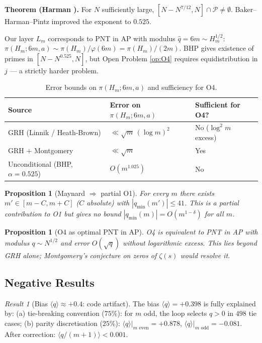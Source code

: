\documentclass[11pt,a4paper]{article}
\newtheorem{proposition}[theorem]{Proposition}
\theoremstyle{definition}
\theoremstyle{remark}
\newtheorem{result}[theorem]{Result}
\newcommand{\qmin}{q_{\min}}
\begin{document}
\smallskip
\noindent\textbf{Theorem (Harman \cite{Harman1982}).}
For $N$ sufficiently large, $[N-N^{7/12},N]\cap\mathcal{P}\ne\emptyset$.
Baker--Harman--Pintz \cite{BakerHarmanPintz2001} improved the
exponent to $0.525$.

Our layer $L_{m}$ corresponds to PNT in AP with modulus
$\hat{q}=6m\sim H_{m}^{1/2}$:
$\pi(H_{m};6m,a)\sim\pi(H_{m})/\varphi(6m)=\pi(H_{m})/(2m)$. BHP
gives existence of primes in $[N-N^{0.525},N]$, but Open Problem
\ref{op:O4} requires equidistribution in $j$ --- a strictly harder
problem.

\begin{table}[ht]\centering
\caption{Error bounds on $\pi(H_{m};6m,a)$ and sufficiency for O4.}
\begin{tabular}{@{}lll@{}}
\toprule
Source & Error on $\pi(H_{m};6m,a)$ & Sufficient for O4? \\
\midrule
GRH (Linnik / Heath-Brown) & $\ll\sqrt{m}\,(\log m)^{2}$ &
No ($\log^{2}m$ excess) \\
GRH $+$ Montgomery & $\ll\sqrt{m}$ & Yes \\
Unconditional (BHP, $\alpha=0.525$) & $O(m^{1.025})$ & No \\
\bottomrule
\end{tabular}
\end{table}

\begin{proposition}[Maynard \cite{Maynard2015} $\Rightarrow$ partial
O1]
For every $m$ there exists $m'\in[m-C,m+C]$ ($C$ absolute) with
$|\qmin(m')|\le 41$. This is a partial contribution to O1 but gives
no bound $|\qmin(m)|=O(m^{1-\delta})$ for all $m$.
\end{proposition}

\begin{proposition}[O4 as optimal PNT in AP]
O4 is equivalent to PNT in AP with modulus $q\sim N^{1/2}$ and error
$O(\sqrt{q})$ without logarithmic excess. This lies beyond GRH alone;
Montgomery's conjecture on zeros of $\zeta(s)$ would resolve it.
\end{proposition}

\subsection{Negative Results}

\begin{negativebox}
\begin{result}[Bias $\langle q\rangle\approx +0.4$: code artifact]
\label{res:bias-artifact}
The bias $\langle q\rangle=+0.398$ is fully explained by:
(a) tie-breaking convention ($75\%$): for $m$ odd, the loop selects
$q>0$ in $498$ tie cases; (b) parity discretisation ($25\%$):
$\langle q\rangle|_{m\text{ even}}=+0.878$,
$\langle q\rangle|_{m\text{ odd}}=-0.081$. After correction:
$\langle q/(m+1)\rangle<0.001$.
\end{result}
\end{negativebox}
\end{document}

